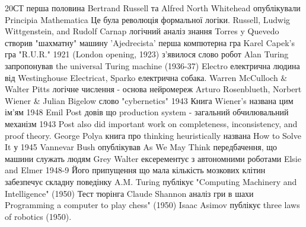 \documentclass[12pt, letterpaper]{article}
\begin{document}
20СТ перша половина
Bertrand Russell та Alfred North Whitehead опублікували Principia Mathematica
Це була революція формальної логіки.
Russell, Ludwig Wittgenstein, and Rudolf Carnap логічний аналіз знання
Torres y Quevedo створив "шахматну" машину 'Ajedrecista' перша компютерна гра
Karel Capek's гра "R.U.R." 1921 (London opening, 1923) з'явилося слово робот
Alan Turing запропонував the universal Turing machine (1936-37)
Electro електрична людина від Westinghouse Electricat, Sparko електрична собака.
Warren McCulloch & Walter Pitts логічне числення - основа нейромереж
Arturo Rosenblueth, Norbert Wiener & Julian Bigelow слово  "cybernetics" 1943
Книга Wiener's названа цим ім'ям 1948
Emil Post довів що production system - загальний обчилювальний механізм 1943
 Post also did important work on completeness, inconsistency, and proof theory.
George Polya книга про thinking heuristically названа How to Solve It у 1945
Vannevar Bush опублікував As We May Think передбачення, що машини служать людям
Grey Walter ексерементує з автономними роботами  Elsie and Elmer 1948-9
Його припущення що мала кількість мозкових клітин забезпечує складну поведінку
A.M. Turing публікує "Computing Machinery and Intelligence" (1950) Тест тюрінга
Claude Shannon аналіз гри в шахи Programming a computer to play chess" (1950)
Isaac Asimov публікує three laws of robotics (1950).
\end{document}
